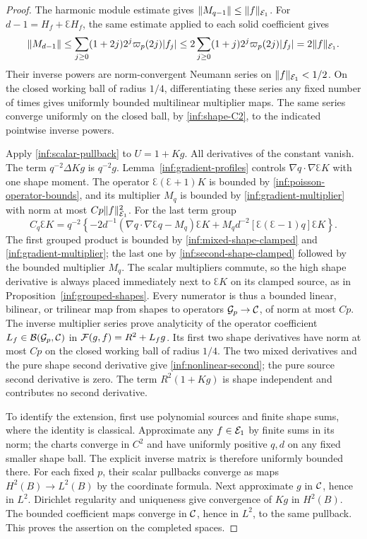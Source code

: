\begin{proof}
The harmonic module estimate gives
$\lVert M_{q-1}\rVert\le\lVert f\rVert_{\mathcal E_1}$. For $d-1=H_f+\Euler H_f$,
the same estimate applied to each solid coefficient gives
\[
 \lVert M_{d-1}\rVert
 \le\sum_{j\ge0}(1+2j)2^j\varpi_p(2j)|f_j|
 \le2\sum_{j\ge0}(1+j)2^j\varpi_p(2j)|f_j|
 =2\lVert f\rVert_{\mathcal E_1}.
\]
Their inverse powers are norm-convergent Neumann series on
$\lVert f\rVert_{\mathcal E_1}<1/2$. On the closed working ball of radius $1/4$,
differentiating these series any fixed number of times gives
uniformly bounded multilinear multiplier maps.
The same series converge uniformly on the closed ball, by
\eqref{inf:shape-C2}, to the indicated pointwise inverse powers.

Apply \eqref{inf:scalar-pullback} to $U=1+Kg$.
All derivatives of the constant vanish. The term $q^{-2}\Delta Kg$
is $q^{-2}g$.
Lemma~\ref{inf:gradient-profiles} controls
$\nabla q\cdot\nabla\Euler K$ with one shape moment.
The operator $\Euler(\Euler+1)K$ is bounded by
\eqref{inf:poisson-operator-bounds}, and its multiplier $M_q$
is bounded by \eqref{inf:gradient-multiplier} with norm at most
$Cp\lVert f\rVert_{\mathcal E_1}^2$.
For the last term group
\[
 C_q\Euler K=q^{-2}\left\{
 -2d^{-1}(\nabla q\cdot\nabla\Euler q-M_q)\Euler K
 +M_qd^{-2}[\Euler(\Euler-1)q]\Euler K\right\}.
\]
The first grouped product is bounded by
\eqref{inf:mixed-shape-clamped} and
\eqref{inf:gradient-multiplier}; the last one by
\eqref{inf:second-shape-clamped} followed by the bounded multiplier
$M_q$. The scalar multipliers commute, so the high shape derivative
is always placed immediately next to $\Euler K$ on its clamped
source, as in Proposition~\ref{inf:grouped-shapes}.
Every numerator is thus a bounded linear, bilinear, or trilinear
map from shapes to operators $\mathcal{G}_p\to\mathcal C$, of norm at most $Cp$.
The inverse multiplier series prove analyticity of the operator
coefficient $L_f\in\mathcal B(\mathcal{G}_p,\mathcal C)$ in
$\mathcal F(g,f)=R^2+L_fg$.
Its first two shape derivatives have norm at most $Cp$ on the
closed working ball of radius $1/4$. The two mixed derivatives and the pure shape second
derivative give \eqref{inf:nonlinear-second}; the pure source
second derivative is zero. The term $R^2(1+Kg)$ is shape independent
and contributes no second derivative.

To identify the extension, first use polynomial sources and finite
shape sums, where the identity is classical. Approximate any
$f\in\mathcal E_1$ by finite sums in its norm; the charts converge in
$C^2$ and have uniformly positive $q,d$ on any fixed smaller shape
ball. The explicit inverse matrix is therefore uniformly
bounded there. For each fixed $p$, their scalar
pullbacks converge as maps $H^2(B)\to L^2(B)$ by the coordinate
formula. Next approximate $g$ in $\mathcal C$, hence in $L^2$.
Dirichlet regularity and uniqueness give convergence of $Kg$ in
$H^2(B)$. The bounded coefficient maps converge in $\mathcal C$, hence
in $L^2$, to the same pullback. This proves the assertion on the
completed spaces.
\end{proof}

